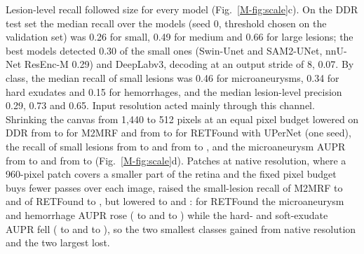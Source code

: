 Lesion-level recall followed size for every model (Fig.~\ref{M-fig:scale}c). On the DDR test set the median recall over the  models (seed 0, threshold chosen on the validation set) was 0.26 for small, 0.49 for medium and 0.66 for large lesions; the best models detected 0.30 of the small ones (Swin-Unet and SAM2-UNet, nnU-Net ResEnc-M 0.29) and DeepLabv3, decoding at an output stride of 8, 0.07. By class, the median recall of small lesions was 0.46 for microaneurysms, 0.34 for hard exudates and 0.15 for hemorrhages, and the median lesion-level precision 0.29, 0.73 and 0.65. Input resolution acted mainly through this channel. Shrinking the canvas from 1,440 to 512 pixels at an equal pixel budget lowered \mAUPR{} on DDR from  to  for M2MRF and from  to  for RETFound with UPerNet (one seed), the recall of small lesions from  to  and from  to , and the microaneurysm AUPR from  to  and from  to  (Fig.~\ref{M-fig:scale}d). Patches at native resolution, where a 960-pixel patch covers a smaller part of the retina and the fixed pixel budget buys fewer passes over each image, raised the small-lesion recall of M2MRF to  and of RETFound to , but lowered \mAUPR{} to  and : for RETFound the microaneurysm and hemorrhage AUPR rose ( to  and  to ) while the hard- and soft-exudate AUPR fell ( to  and  to ), so the two smallest classes gained from native resolution and the two largest lost.

